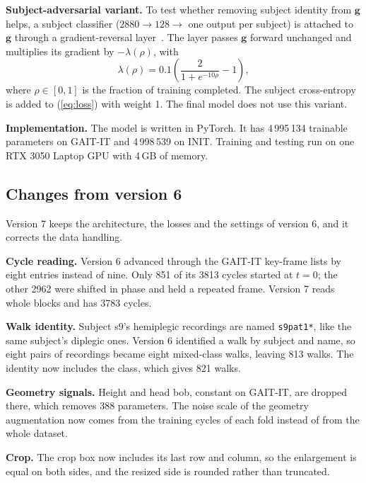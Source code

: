 \documentclass[conference]{IEEEtran}
\begin{document}
\textbf{Subject-adversarial variant.} To test whether removing subject identity from $\mathbf{g}$ helps, a subject classifier ($2880\to128\to$ one output per subject) is attached to $\mathbf{g}$ through a gradient-reversal layer~\cite{dann}. The layer passes $\mathbf{g}$ forward unchanged and multiplies its gradient by $-\lambda(\rho)$, with
\begin{equation}
\lambda(\rho)=0.1\left(\frac{2}{1+e^{-10\rho}}-1\right),
\label{eq:lambda}
\end{equation}
where $\rho\in[0,1]$ is the fraction of training completed. The subject cross-entropy is added to (\ref{eq:loss}) with weight 1. The final model does not use this variant.

\textbf{Implementation.} The model is written in PyTorch. It has 4\,995\,134 trainable parameters on GAIT-IT and 4\,998\,539 on INIT. Training and testing run on one RTX 3050 Laptop GPU with 4\,GB of memory.

\subsection{Changes from version 6}
\label{sec:changes}

Version 7 keeps the architecture, the losses and the settings of version 6, and it corrects the data handling.

\textbf{Cycle reading.} Version 6 advanced through the GAIT-IT key-frame lists by eight entries instead of nine. Only 851 of its 3813 cycles started at $t=0$; the other 2962 were shifted in phase and held a repeated frame. Version 7 reads whole blocks and has 3783 cycles.

\textbf{Walk identity.} Subject s9's hemiplegic recordings are named \texttt{s9pat1*}, like the same subject's diplegic ones. Version 6 identified a walk by subject and name, so eight pairs of recordings became eight mixed-class walks, leaving 813 walks. The identity now includes the class, which gives 821 walks.

\textbf{Geometry signals.} Height and head bob, constant on GAIT-IT, are dropped there, which removes 388 parameters. The noise scale of the geometry augmentation now comes from the training cycles of each fold instead of from the whole dataset.

\textbf{Crop.} The crop box now includes its last row and column, so the enlargement is equal on both sides, and the resized side is rounded rather than truncated.
\end{document}
